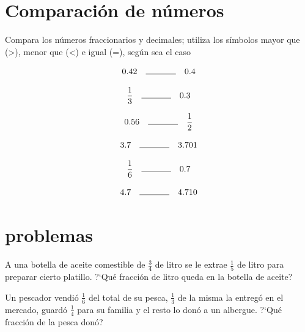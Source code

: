 \documentclass[11pt]{article}
\begin{document}
\vspace{1cm}

\section{Comparaci\'on de n\'umeros}

Compara los n\'umeros fraccionarios y decimales; utiliza los s\'imbolos mayor que
(>), menor que (<) e igual (=), seg\'un sea el caso
\begin{multicols}{3}
\setcounter{equation}{0}

\begin{equation} 0.42 \quad \line(1,0){35} \quad 0.4    \end{equation}

\begin{equation} \frac{1}{3} \quad \line(1,0){35} \quad 0.3   \end{equation}

\begin{equation} 0.56 \quad \line(1,0){35} \quad \frac{1}{2}   \end{equation}

\begin{equation} 3.7 \quad \line(1,0){35} \quad 3.701   \end{equation}

\begin{equation} \frac{1}{6} \quad \line(1,0){35} \quad 0.7   \end{equation}

\begin{equation} 4.7 \quad \line(1,0){35} \quad  4.710  \end{equation}
\end{multicols}

\vspace{1cm}

\section{problemas}

A una botella de aceite comestible de $\frac{3}{4}$ de litro se le
extrae $\frac{1}{5}$ de litro para preparar cierto platillo. ?`Qu\'e fracci\'on 
de litro queda en la botella de aceite?

\vspace{1cm}

Un pescador vendi\'o $\frac{1}{6}$ del total de su pesca, $\frac{1}{3}$ 
de la misma la entreg\'o en el mercado, guard\'o $\frac{1}{4}$ para su familia y
el resto lo don\'o a un albergue. ?`Qu\'e fracci\'on de la pesca don\'o?
\end{document}
